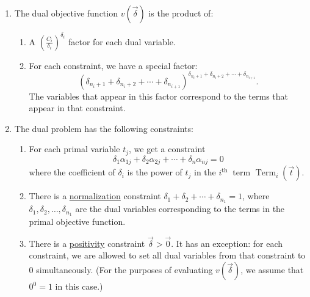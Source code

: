 \documentclass[11pt,a4paper]{article}
\begin{document}
\begin{enumerate}[]
    \item The dual objective function $v(\vec{\delta})$ is the product of:
    \begin{enumerate}[$\bullet$]
        \item A $\left(\frac{C_i}{\delta_i}\right)^{\delta_i}$ factor for each dual variable.
        \item For each constraint, we have a special factor:
        $$
        \left(\delta_{n_i+1}+\delta_{n_i+2}+\cdots+\delta_{n_{i+1}}\right)^{\delta_{n_i+1}+\delta_{n_i+2}+\cdots+\delta_{n_{i+1}}} .
        $$
        The variables that appear in this factor correspond to the terms that appear in that constraint.
    \end{enumerate}
    \item The dual problem has the following constraints:
    \begin{enumerate}[$\bullet$]
        \item For each primal variable $t_j$, we get a constraint
        $$
        \delta_1 \alpha_{1j}+\delta_2 \alpha_{2j}+\cdots+\delta_n \alpha_{n j}=0
        $$
        where the coefficient of $\delta_i$ is the power of $t_j$ in the $i^{\text {th }}$ term $\operatorname{Term}_i(\vec{t})$.
        \item There is a \underline{normalization} constraint $\delta_1+\delta_2+\cdots+\delta_{n_1}=1$, where $\delta_1, \delta_2, \ldots, \delta_{n_1}$ are the dual variables corresponding to the terms in the primal objective function.
        \item There is a \underline{positivity} constraint $\vec{\delta}>\vec{0}$. It has an exception: for each constraint, we are allowed to set all dual variables from that constraint to 0 simultaneously. (For the purposes of evaluating $v(\vec{\delta})$, we assume that $0^0=1$ in this case.)
    \end{enumerate}
\end{enumerate}
\end{document}
